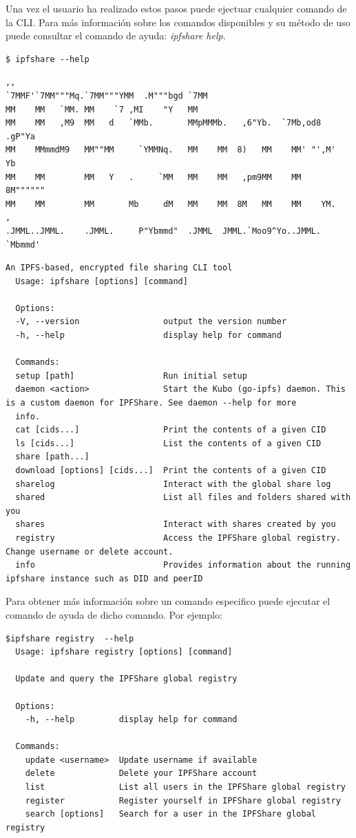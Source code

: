 Una vez el usuario ha realizado estos pasos puede ejectuar cualquier comando de la CLI. Para más información sobre los comandos disponibles y su método de uso puede consultar el comando de ayuda:  \textit{ipfshare help}.


\begin{verbatim}
$ ipfshare --help
\end{verbatim}
\begin{verbatim}
,,
`7MMF'`7MM"""Mq.`7MM"""YMM  .M"""bgd `7MM
MM    MM   `MM. MM    `7 ,MI    "Y   MM
MM    MM   ,M9  MM   d   `MMb.       MMpMMMb.   ,6"Yb.  `7Mb,od8 .gP"Ya
MM    MMmmdM9   MM""MM     `YMMNq.   MM    MM  8)   MM    MM' "',M'   Yb
MM    MM        MM   Y   .     `MM   MM    MM   ,pm9MM    MM    8M""""""
MM    MM        MM       Mb     dM   MM    MM  8M   MM    MM    YM.    ,
.JMML..JMML.    .JMML.     P"Ybmmd"  .JMML  JMML.`Moo9^Yo..JMML.   `Mbmmd'
\end{verbatim}
\begin{verbatim}
An IPFS-based, encrypted file sharing CLI tool
  Usage: ipfshare [options] [command]

  Options:
  -V, --version                 output the version number
  -h, --help                    display help for command

  Commands:
  setup [path]                  Run initial setup
  daemon <action>               Start the Kubo (go-ipfs) daemon. This is a custom daemon for IPFShare. See daemon --help for more
  info.
  cat [cids...]                 Print the contents of a given CID
  ls [cids...]                  List the contents of a given CID
  share [path...]
  download [options] [cids...]  Print the contents of a given CID
  sharelog                      Interact with the global share log
  shared                        List all files and folders shared with you
  shares                        Interact with shares created by you
  registry                      Access the IPFShare global registry. Change username or delete account.
  info                          Provides information about the running ipfshare instance such as DID and peerID

\end{verbatim}

Para obtener más información sobre un comando especifico puede ejecutar el comando de ayuda de dicho comando. Por ejemplo:
\begin{verbatim}
$ipfshare registry  --help
  Usage: ipfshare registry [options] [command]

  Update and query the IPFShare global registry

  Options:
    -h, --help         display help for command

  Commands:
    update <username>  Update username if available
    delete             Delete your IPFShare account
    list               List all users in the IPFShare global registry
    register           Register yourself in IPFShare global registry
    search [options]   Search for a user in the IPFShare global registry
\end{verbatim}